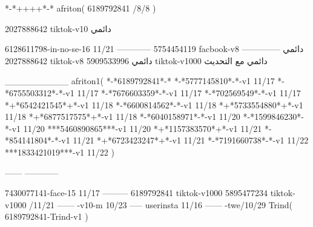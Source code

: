*-*++++*-*
afriton(
6189792841 /8/8
)

2027888642 tiktok-v10
دائمي

6128611798-in-no-se-16 11/21
------------
5754454119 facbook-v8
دائمي
--------------
2027888642 tiktok-v8
دائمي
5909533996 tiktok-v1000
دائمي مع التحديث

__________
afriton1(
*-*6189792841*-*
*-*5777145810*-*-v1 11/17
*-*6755503312*-*-v1 11/17
*-*7676603359*-*-v1 11/17
*-*702569549*-*-v1 11/17
*+*6542421545*+*-v1 11/18
*-*6600814562*-*-v1 11/18
*+*5733554880*+*-v1 11/18
*+*6877517575*+*-v1 11/18
*-*6040158971*-*-v1 11/20
*-*1599846230*-*-v1 11/20
***5460890865***-v1 11/20
*+*1157383570*+*-v1 11/21
*-*854141804*-*-v1 11/21
*+*6723423247*+*-v1 11/21
*-*7191660738*-*-v1 11/22
***1833421019***-v1 11/22
)

------
------------

7430077141-face-15 11/17
---------
6189792841 tiktok-v1000
5895477234 tiktok-v1000 /11/21
------
-v10-m 10/23
-----
userinsta 11/16
------
-twe/10/29
Trind(
6189792841-Trind-v1 
)
